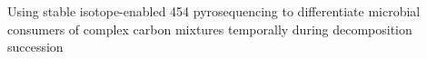 Using stable isotope-enabled 454 pyrosequencing to differentiate microbial consumers of complex carbon mixtures temporally during decomposition succession